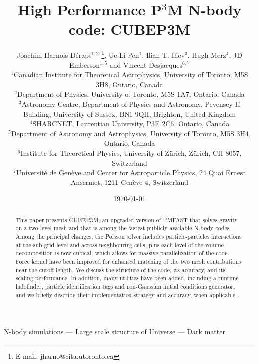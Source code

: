 \documentclass[useAMS,usenatbib]{mn2e}
\title[{\small}  High Performance P$^{3}$M N-body code: CUBEP3M]{{\small} High Performance P$^{3}$M N-body code: CUBEP3M}
\author[Joachim Harnois-D\'{e}raps, Ue-Li Pen, Ilian T. Iliev, Hugh Merz, JD Emberson, Vincent Desjacques]{Joachim Harnois-D\'{e}raps$^{1,2}$ 
\thanks{E-mail: jharno@cita.utoronto.ca},  Ue-Li Pen$^{1}$, 
Ilian T. Iliev$^{3}$, Hugh Merz$^{4}$, \newauthor
JD Emberson$^{1,5}$ and Vincent Desjacques$^{6,7}$\\
$^{1}$Canadian Institute for Theoretical Astrophysics, University of
Toronto, M5S 3H8, Ontario, Canada\\
$^{2}$Department of Physics, University of Toronto, M5S 1A7, Ontario,  Canada\\
$^{3}$Astronomy Centre, Department of Physics and Astronomy, Pevensey II Building, University of Sussex, BN1 9QH, Brighton, United Kingdom\\
$^{4}$SHARCNET, Laurentian University, P3E 2C6, Ontario, Canada\\
$^{5}$Department of Astronomy and Astrophysics, University of Toronto, M5S 3H4, Ontario, Canada\\
$^{6}$Institute for Theoretical Physics, University of Z\"{u}rich, Z\"{u}rich, CH 8057, Switzerland\\
$^{7}$Universit\'{e} de Gen\`{e}ve and Center for Astroparticle Physics, 24 Quai Ernest Ansermet, 1211 Gen\`{e}ve 4, Switzerland}
\begin{document}
\date{\today}

\pagerange{\pageref{firstpage}--\pageref{lastpage}} 

\maketitle

\label{firstpage}

\begin{abstract}
This paper presents {\small CUBEP3M}, an upgraded version of {\small PMFAST} that
solves gravity on a two-level mesh and that is among the fastest publicly available N-body codes. 
Among the principal changes, the Poisson solver includes particle-particles interactions
at the sub-grid level and across neighbouring cells, plus each level of the volume decomposition is now cubical,
which allows for massive parallelization of the code.
Force kernel have been improved for enhanced matching of the two mesh contributions near the cutoff length.
We discuss the structure of the code, its accuracy, and its scaling performance.
In addition, many utilities have been added, including a runtime halofinder,
particle identification tags and non-Gaussian initial conditions generator, and we briefly describe their implementation strategy
and accuracy, when applicable . 

\end{abstract}

\begin{keywords}
N-body simulations --- Large scale structure of Universe --- Dark matter
\end{keywords}









%

{}
%

\bsp

\label{lastpage}
\end{document}
